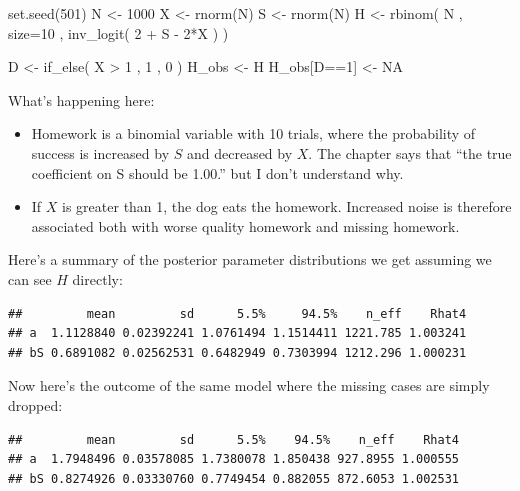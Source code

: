 \documentclass[
]{book}
\newenvironment{Shaded}{\begin{snugshade}}{\end{snugshade}}
\newcommand{\AttributeTok}[1]{\textcolor[rgb]{0.77,0.63,0.00}{#1}}
\newcommand{\ConstantTok}[1]{\textcolor[rgb]{0.00,0.00,0.00}{#1}}
\newcommand{\DecValTok}[1]{\textcolor[rgb]{0.00,0.00,0.81}{#1}}
\newcommand{\FunctionTok}[1]{\textcolor[rgb]{0.00,0.00,0.00}{#1}}
\newcommand{\NormalTok}[1]{#1}
\newcommand{\OtherTok}[1]{\textcolor[rgb]{0.56,0.35,0.01}{#1}}
\newcommand{\SpecialCharTok}[1]{\textcolor[rgb]{0.00,0.00,0.00}{#1}}
\providecommand{\tightlist}{%
  \setlength{\itemsep}{0pt}\setlength{\parskip}{0pt}}
\begin{document}
\begin{Shaded}
\begin{Highlighting}[]
\FunctionTok{set.seed}\NormalTok{(}\DecValTok{501}\NormalTok{) }
\NormalTok{N }\OtherTok{\textless{}{-}} \DecValTok{1000} 
\NormalTok{X }\OtherTok{\textless{}{-}} \FunctionTok{rnorm}\NormalTok{(N) }
\NormalTok{S }\OtherTok{\textless{}{-}} \FunctionTok{rnorm}\NormalTok{(N)}
\NormalTok{H }\OtherTok{\textless{}{-}} \FunctionTok{rbinom}\NormalTok{( N , }\AttributeTok{size=}\DecValTok{10}\NormalTok{ , }\FunctionTok{inv\_logit}\NormalTok{( }\DecValTok{2} \SpecialCharTok{+}\NormalTok{ S }\SpecialCharTok{{-}} \DecValTok{2}\SpecialCharTok{*}\NormalTok{X ) )}

\NormalTok{D }\OtherTok{\textless{}{-}} \FunctionTok{if\_else}\NormalTok{( X }\SpecialCharTok{\textgreater{}} \DecValTok{1}\NormalTok{ , }\DecValTok{1}\NormalTok{ , }\DecValTok{0}\NormalTok{ ) }
\NormalTok{H\_obs }\OtherTok{\textless{}{-}}\NormalTok{ H}
\NormalTok{H\_obs[D}\SpecialCharTok{==}\DecValTok{1}\NormalTok{] }\OtherTok{\textless{}{-}} \ConstantTok{NA}
\end{Highlighting}
\end{Shaded}

What's happening here:

\begin{itemize}
\tightlist
\item
  Homework is a binomial variable with 10 trials, where the probability of success is increased by \(S\) and decreased by \(X\). The chapter says that ``the true coefficient on S should be 1.00.'' but I don't understand why.
\item
  If \(X\) is greater than 1, the dog eats the homework. Increased noise is therefore associated both with worse quality homework and missing homework.
\end{itemize}

Here's a summary of the posterior parameter distributions we get assuming we can see \(H\) directly:

\begin{verbatim}
##         mean         sd      5.5%     94.5%    n_eff    Rhat4
## a  1.1128840 0.02392241 1.0761494 1.1514411 1221.785 1.003241
## bS 0.6891082 0.02562531 0.6482949 0.7303994 1212.296 1.000231
\end{verbatim}

Now here's the outcome of the same model where the missing cases are simply dropped:

\begin{verbatim}
##         mean         sd      5.5%    94.5%    n_eff    Rhat4
## a  1.7948496 0.03578085 1.7380078 1.850438 927.8955 1.000555
## bS 0.8274926 0.03330760 0.7749454 0.882055 872.6053 1.002531
\end{verbatim}
\end{document}
